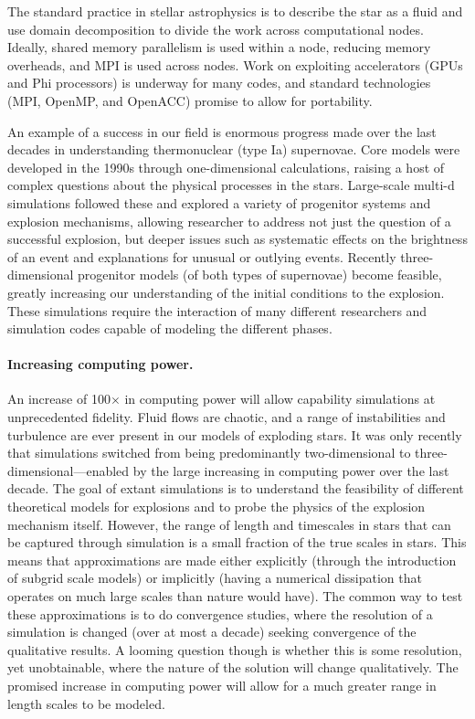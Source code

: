 \documentclass[11pt,twocolumn]{article}
\begin{document}
The standard practice in stellar astrophysics is to describe the star
as a fluid and use domain decomposition to divide the work across
computational nodes.  Ideally, shared memory parallelism is used
within a node, reducing memory overheads, and MPI is used across
nodes.  Work on exploiting accelerators (GPUs and Phi processors) is
underway for many codes, and standard technologies (MPI, OpenMP, and
OpenACC) promise to allow for portability.

An example of a success in our field is enormous progress made over
the last decades in understanding thermonuclear (type Ia) supernovae.
Core models were developed in the 1990s through one-dimensional
calculations, raising a host of complex questions about the physical
processes in the stars.  Large-scale multi-d simulations followed
these and explored a variety of progenitor systems and explosion
mechanisms, allowing researcher to address not just the question of a
successful explosion, but deeper issues such as systematic effects on
the brightness of an event and explanations for unusual or outlying
events.  Recently three-dimensional progenitor models (of both types
of supernovae) become feasible, greatly increasing our understanding
of the initial conditions to the explosion.  These simulations require
the interaction of many different researchers and simulation codes
capable of modeling the different phases.  

\paragraph*{Increasing computing power.}

An increase of 100$\times$ in computing power will allow capability
simulations at unprecedented fidelity. Fluid flows are chaotic, and a
range of instabilities and turbulence are ever present in our models
of exploding stars. It was only recently that simulations switched
from being predominantly two-dimensional to
three-dimensional---enabled by the large increasing in computing power
over the last decade.  The goal of extant simulations is to understand
the feasibility of different theoretical models for explosions and to
probe the physics of the explosion mechanism itself.  However, the
range of length and timescales in stars that can be captured through
simulation is a small fraction of the true scales in stars.  This
means that approximations are made either explicitly (through the
introduction of subgrid scale models) or implicitly (having a
numerical dissipation that operates on much large scales than nature
would have).  The common way to test these approximations is to do
convergence studies, where the resolution of a simulation is changed
(over at most a decade) seeking convergence of the qualitative
results.  A looming question though is whether this is some
resolution, yet unobtainable, where the nature of the solution will
change qualitatively.  The promised increase in computing power will
allow for a much greater range in length scales to be modeled.
\end{document}
